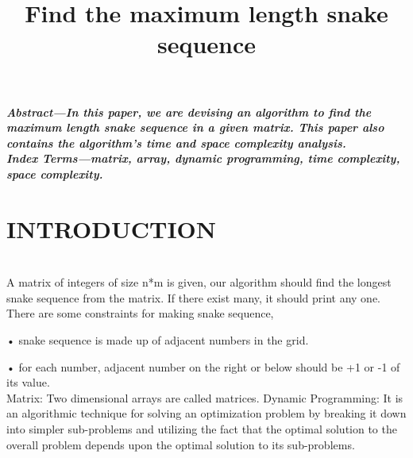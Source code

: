 \documentclass[conference]{IEEEtran}
\begin{document}
\title{Find the maximum length snake sequence  \\
}
\author{
\and
{}
\and
{}
}

\maketitle
{\textbf{\textit{Abstract—In this paper, we are devising an algorithm to find
the maximum length snake sequence in a given matrix. This
paper also contains the algorithm’s time and space complexity
analysis. \\
Index Terms—matrix, array, dynamic programming, time
complexity, space complexity. \\ 
}}}
\maketitle

\section{INTRODUCTION}\\
A matrix of integers of size n*m is given, our algorithm
should find the longest snake sequence from the matrix. If
there exist many, it should print any one. There are some
constraints for making snake sequence, 

• snake sequence is made up of adjacent numbers in the grid.
 
• for each number, adjacent number on the right or below
should be +1 or -1 of its value.
     \\
Matrix: Two dimensional arrays are called matrices.
Dynamic Programming: It is an algorithmic technique for
solving an optimization problem by breaking it down into
simpler sub-problems and utilizing the fact that the optimal
solution to the overall problem depends upon the optimal
solution to its sub-problems.\\
\end{document}
